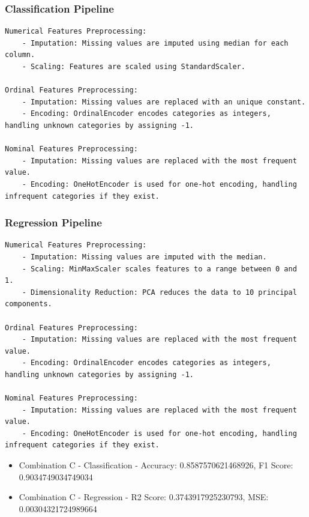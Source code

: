 \documentclass{article}
\begin{document}
\subsubsection*{Classification Pipeline}

\begin{lstlisting}
Numerical Features Preprocessing:
    - Imputation: Missing values are imputed using median for each column.
    - Scaling: Features are scaled using StandardScaler.

Ordinal Features Preprocessing:
    - Imputation: Missing values are replaced with an unique constant.
    - Encoding: OrdinalEncoder encodes categories as integers, handling unknown categories by assigning -1.

Nominal Features Preprocessing:
    - Imputation: Missing values are replaced with the most frequent value.
    - Encoding: OneHotEncoder is used for one-hot encoding, handling infrequent categories if they exist.

\end{lstlisting}

\subsubsection*{Regression Pipeline}

\begin{lstlisting}
Numerical Features Preprocessing:
    - Imputation: Missing values are imputed with the median.
    - Scaling: MinMaxScaler scales features to a range between 0 and 1.
    - Dimensionality Reduction: PCA reduces the data to 10 principal components.

Ordinal Features Preprocessing:
    - Imputation: Missing values are replaced with the most frequent value.
    - Encoding: OrdinalEncoder encodes categories as integers, handling unknown categories by assigning -1.

Nominal Features Preprocessing:
    - Imputation: Missing values are replaced with the most frequent value.
    - Encoding: OneHotEncoder is used for one-hot encoding, handling infrequent categories if they exist.

\end{lstlisting}

\begin{itemize}
\item Combination C - Classification - Accuracy: 0.8587570621468926, F1 Score: 0.9034749034749034
\item Combination C - Regression - R2 Score: 0.3743917925230793, MSE: 0.00304321724989664
\end{itemize}
\end{document}
